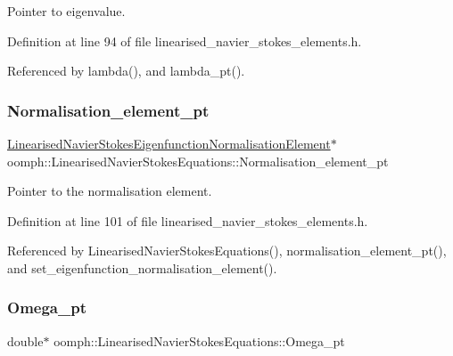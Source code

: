 Pointer to eigenvalue. 



Definition at line 94 of file linearised\+\_\+navier\+\_\+stokes\+\_\+elements.\+h.



Referenced by lambda(), and lambda\+\_\+pt().

\mbox{\label{classoomph_1_1LinearisedNavierStokesEquations_a458b34ae6dfb06578ff198cecffcd8ba}} 
\subsubsection{\texorpdfstring{Normalisation\+\_\+element\+\_\+pt}{Normalisation\_element\_pt}}
{\footnotesize\ttfamily \hyperlink{classoomph_1_1LinearisedNavierStokesEigenfunctionNormalisationElement}{Linearised\+Navier\+Stokes\+Eigenfunction\+Normalisation\+Element}$\ast$ oomph\+::\+Linearised\+Navier\+Stokes\+Equations\+::\+Normalisation\+\_\+element\+\_\+pt\hspace{0.3cm}{\ttfamily [protected]}}



Pointer to the normalisation element. 



Definition at line 101 of file linearised\+\_\+navier\+\_\+stokes\+\_\+elements.\+h.



Referenced by Linearised\+Navier\+Stokes\+Equations(), normalisation\+\_\+element\+\_\+pt(), and set\+\_\+eigenfunction\+\_\+normalisation\+\_\+element().

\mbox{\label{classoomph_1_1LinearisedNavierStokesEquations_af4ef888df31fc1283960078bb4bc01fd}} 
\subsubsection{\texorpdfstring{Omega\+\_\+pt}{Omega\_pt}}
{\footnotesize\ttfamily double$\ast$ oomph\+::\+Linearised\+Navier\+Stokes\+Equations\+::\+Omega\+\_\+pt\hspace{0.3cm}{\ttfamily [protected]}}



